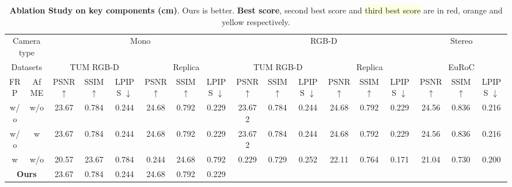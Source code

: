 \begin{table*}
\footnotesize
  \centering
   \setlength\tabcolsep{1.9pt} 
  \begin{tabular}{@{}cc|ccc|ccc|ccc|ccc|ccc} %
    \toprule   
   \multicolumn{2}{c|}{Camera type} & \multicolumn{6}{c|}{Mono} & \multicolumn{6}{c|}{RGB-D} & \multicolumn{3}{c}{Stereo}\\
   \multicolumn{2}{c|}{Datasets} & \multicolumn{3}{c}{TUM RGB-D} & \multicolumn{3}{c|}{Replica} & \multicolumn{3}{c}{TUM RGB-D} & \multicolumn{3}{c|}{Replica} & \multicolumn{3}{c}{EuRoC} \\
    \midrule
   FRP & AfME &  PSNR $\uparrow$ &SSIM $\uparrow$   &LPIPS $\downarrow$ &  PSNR $\uparrow$ &SSIM $\uparrow$   &LPIPS $\downarrow$ &  PSNR $\uparrow$ &SSIM $\uparrow$   &LPIPS $\downarrow$ &  PSNR $\uparrow$ &SSIM $\uparrow$   &LPIPS $\downarrow$ &  PSNR $\uparrow$ &SSIM $\uparrow$   &LPIPS $\downarrow$  \\
    \midrule          
       w/o & w/o & 23.67 & 0.784 & 0.244 & 24.68 &	0.792 &	0.229 & 23.672 & 0.784 & 0.244 & 24.68   &	0.792 &	0.229 & 24.56 & 0.836 & 0.216 \\
       w/o & w   & 23.67 & 0.784 & 0.244 & 24.68 &	0.792 &	0.229 & 23.672 & 0.784 & 0.244 & 24.68   &	0.792 &	0.229 & 24.56 & 0.836 & 0.216 \\
       w   & w/o & 20.57 & 23.67 & 0.784 & 0.244 & 24.68 &	0.792 &	0.229	&0.729	&0.252 & 22.11 &	0.764	& 0.171 & 21.04	&0.730	&0.200 \\
       \midrule
       \multicolumn{2}{c|}{\bf Ours} &23.67 & 0.784 & 0.244 & 24.68 &	0.792 &	0.229  & \cellcolor{lightred}{\bf 24.53} & \cellcolor{lightred}{\bf 0.821} & \cellcolor{lightred}{\bf 0.163} & \cellcolor{lightred}{\bf 26.92} & \cellcolor{lightred}{\bf 0.863} & \cellcolor{lightred}{\bf 0.086} & \cellcolor{lightred}{\bf 26.37} & \cellcolor{lightred}{\bf 0.875} & \cellcolor{lightred}{\bf 0.112} \\
    \bottomrule
  \end{tabular}
  \caption{{\bf Ablation Study on key components (\rm{cm})}. Ours is better. \colorbox{lightred}{\bf Best score}, \colorbox{lightorange}{second best score} and \colorbox{lightyellow}{third best score} are in red, orange and yellow respectively.}
  \label{tab:example}
\end{table*}

